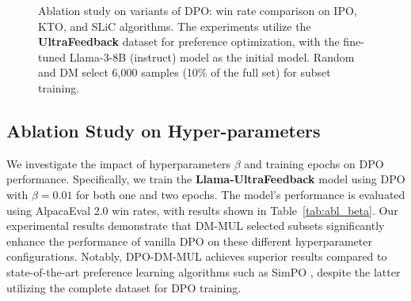 \begin{figure*}[h]
	\centering
        \vspace{-10pt}
	\caption{Ablation study on variants of DPO: win rate comparison on IPO, KTO, and SLiC algorithms. The experiments utilize the \textbf{UltraFeedback} dataset for preference optimization, with the fine-tuned Llama-3-8B (instruct) model as the initial model. Random and DM select 6,000 samples (10\% of the full set) for subset training.
	}
	\label{fig:abl_po_ins}
	\vspace{-15pt}
\end{figure*}

\subsection{Ablation Study on Hyper-parameters}
\label{app:lr-abl}

We investigate the impact of hyperparameters $\beta$ and training epochs on DPO performance. Specifically, we train the \textbf{Llama-UltraFeedback} model using DPO with $\beta=0.01$ for both one and two epochs. The model's performance is evaluated using AlpacaEval 2.0 win rates, with results shown in Table~\ref{tab:abl_beta}. Our experimental results demonstrate that DM-MUL selected subsets significantly enhance the performance of vanilla DPO on these different hyperparameter configurations. Notably, DPO-DM-MUL achieves superior results compared to state-of-the-art preference learning algorithms such as SimPO \citep{meng2024simpo}, despite the latter utilizing the complete dataset for DPO training.

